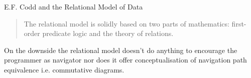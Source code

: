 \begin{frame}{E.F. Codd and the Relational Model of Data}
\begin{quote}
The relational model is solidly based on two parts of mathematics: first-
order predicate logic and the theory of relations.
\end{quote} 

On the downside the relational model doesn't do anything to encourage  the programmer as navigator nor does it offer conceptualisation of navigation path equivalence i.e. commutative diagrams.
\end{frame}

